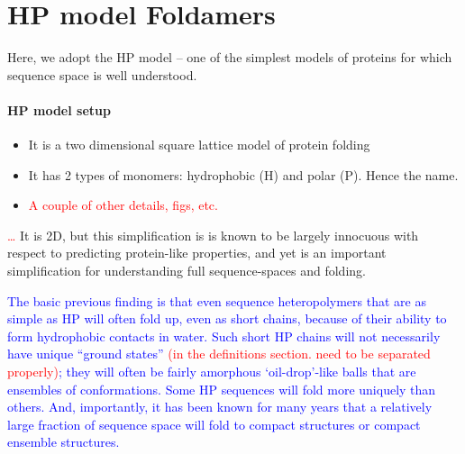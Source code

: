 \documentclass[12pt]{paper}
\newcommand{\red}[1]{\textcolor{red}{#1}}
\newcommand{\blue}[1]{\textcolor{blue}{#1}}
\begin{document}
\section{HP model Foldamers}
Here, we adopt the HP model -- one of the simplest models of proteins for which sequence 
space is well understood.   
\paragraph{HP model setup} 
\begin{itemize}
 \item It is a two dimensional square lattice model of protein folding
 \item It has 2 types of monomers: hydrophobic (H) and polar (P). Hence the name.
 \item \red{A couple of other details, figs, etc.}
\end{itemize}
\red{\dots}  It is 2D, but this simplification is  is known to be largely innocuous 
with respect to predicting protein-like properties, and yet is an important simplification for 
understanding full sequence-spaces and folding.   

\blue{The basic previous finding is that even sequence heteropolymers that are as simple as HP 
will often fold up, even as short chains, because of their ability to form hydrophobic contacts in 
water.  Such short HP chains will not necessarily have unique ``ground states'' \red{(in the 
definitions section. need to be separated properly)}; they will often be fairly amorphous 
`oil-drop’-like balls that are ensembles of conformations.  Some HP sequences will fold more 
uniquely than others.  And, importantly, it has been known for many years \cite{lau1989lattice} 
that a relatively large fraction of sequence space will fold to compact structures or compact 
ensemble structures.}
\end{document}

